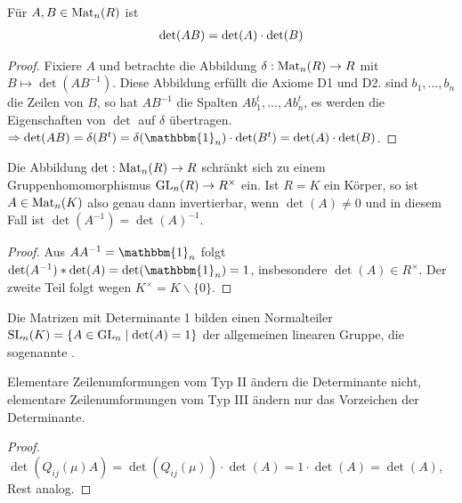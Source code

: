 \begin{theorem}[Determinantenmultiplikationssatz]
	Für $A,B\in \operatorname{Mat}_n(R)$ ist 
	\begin{align}
		\det(AB)=\det(A)\cdot \det(B)\notag
	\end{align}
\end{theorem}
\begin{proof}
	Fixiere $A$ und betrachte die Abbildung $\delta: \operatorname{Mat}_n(R)\to R$ mit $B\mapsto \det(AB^{-1})$. Diese Abbildung erfüllt die Axiome 
	D1 und D2. sind $b_1,...,b_n$ die Zeilen von $B$, so hat $AB^{-1}$ die Spalten $Ab_1^t,...,Ab_n^t$, es werden die Eigenschaften 
	von $\det$ auf $\delta$ übertragen. \\
	$\Rightarrow \det(AB)=\delta(B^t)=\delta(\mathbbm{1}_n)\cdot \det(B^t)=\det(A)\cdot \det(B)$.
\end{proof}

\begin{conclusion}
	Die Abbildung $\det:\operatorname{Mat}_n(R)\to R$ schränkt sich zu einem Gruppenhomomorphismus $\operatorname{GL}_n(R)\to 
	R^{\times}$ ein. Ist $R=K$ ein Körper, so ist $A\in \operatorname{Mat}_n(K)$ also genau dann invertierbar, wenn $\det(A)\neq 0$ und in 
	diesem Fall ist $\det(A^{-1})=\det(A)^{-1}$.
\end{conclusion}
\begin{proof}
	Aus $AA^{-1}=\mathbbm{1}_n$ folgt $\det(A^{-1})*\det(A)=\det(\mathbbm{1}_n)=1$, insbesondere $\det(A)\in R^{\times}$. Der zweite Teil folgt wegen 
	$K^{\times}=K\backslash \{0\}$.
\end{proof}

\begin{conclusion}
	Die Matrizen mit Determinante 1 bilden einen Normalteiler $\operatorname{SL}_n(K)=\{A\in \operatorname{GL}_n \mid \det(A)=1\}$ der 
	allgemeinen linearen Gruppe, die sogenannte .
\end{conclusion}

\begin{conclusion}
	Elementare Zeilenumformungen vom Typ II ändern die Determinante nicht, elementare Zeilenumformungen vom 
	Typ III ändern nur das Vorzeichen der Determinante.
\end{conclusion}
\begin{proof}
	$\det(Q_{ij}(\mu)A)=\det(Q_{ij}(\mu)) \cdot \det(A)= 1\cdot \det(A) = \det(A)$, Rest analog.
\end{proof}